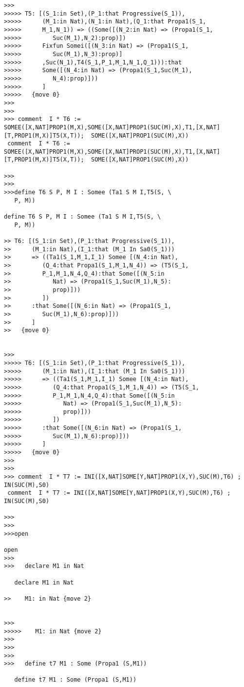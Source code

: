 \documentclass{article}
\begin{document}
\begin{verbatim}
>>>
>>>>> T5: [(S_1:in Set),(P_1:that Progressive(S_1)),
>>>>>      (M_1:in Nat),(N_1:in Nat),(Q_1:that Propa1(S_1,
>>>>>      M_1,N_1)) => ((Some([(N_2:in Nat) => (Propa1(S_1,
>>>>>         Suc(M_1),N_2):prop)])
>>>>>      Fixfun Somei([(N_3:in Nat) => (Propa1(S_1,
>>>>>         Suc(M_1),N_3):prop)]
>>>>>      ,Suc(N_1),T4(S_1,P_1,M_1,N_1,Q_1))):that
>>>>>      Some([(N_4:in Nat) => (Propa1(S_1,Suc(M_1),
>>>>>         N_4):prop)]))
>>>>>      ]
>>>>>   {move 0}
>>>
>>>
>>> comment  I * T6 := SOMEE([X,NAT]PROP1(M,X),SOME([X,NAT]PROP1(SUC(M),X),T1,[X,NAT][T,PROP1(M,X)]T5(X,T));  SOME([X,NAT]PROP1(SUC(M),X))
 comment  I * T6 := SOMEE([X,NAT]PROP1(M,X),SOME([X,NAT]PROP1(SUC(M),X),T1,[X,NAT][T,PROP1(M,X)]T5(X,T));  SOME([X,NAT]PROP1(SUC(M),X))

>>>
>>>
>>>define T6 S P, M I : Somee (Ta1 S M I,T5(S, \
   P, M))

define T6 S P, M I : Somee (Ta1 S M I,T5(S, \
   P, M))

>> T6: [(S_1:in Set),(P_1:that Progressive(S_1)),
>>      (M_1:in Nat),(I_1:that (M_1 In Sa0(S_1)))
>>      => ((Ta1(S_1,M_1,I_1) Somee [(N_4:in Nat),
>>         (Q_4:that Propa1(S_1,M_1,N_4)) => (T5(S_1,
>>         P_1,M_1,N_4,Q_4):that Some([(N_5:in
>>            Nat) => (Propa1(S_1,Suc(M_1),N_5):
>>            prop)]))
>>         ])
>>      :that Some([(N_6:in Nat) => (Propa1(S_1,
>>         Suc(M_1),N_6):prop)]))
>>      ]
>>   {move 0}


>>>
>>>>> T6: [(S_1:in Set),(P_1:that Progressive(S_1)),
>>>>>      (M_1:in Nat),(I_1:that (M_1 In Sa0(S_1)))
>>>>>      => ((Ta1(S_1,M_1,I_1) Somee [(N_4:in Nat),
>>>>>         (Q_4:that Propa1(S_1,M_1,N_4)) => (T5(S_1,
>>>>>         P_1,M_1,N_4,Q_4):that Some([(N_5:in
>>>>>            Nat) => (Propa1(S_1,Suc(M_1),N_5):
>>>>>            prop)]))
>>>>>         ])
>>>>>      :that Some([(N_6:in Nat) => (Propa1(S_1,
>>>>>         Suc(M_1),N_6):prop)]))
>>>>>      ]
>>>>>   {move 0}
>>>
>>>
>>> comment  I * T7 := INI([X,NAT]SOME[Y,NAT]PROP1(X,Y),SUC(M),T6) ; IN(SUC(M),S0)
 comment  I * T7 := INI([X,NAT]SOME[Y,NAT]PROP1(X,Y),SUC(M),T6) ; IN(SUC(M),S0)

>>>
>>>
>>>open

open
>>>
>>>   declare M1 in Nat

   declare M1 in Nat

>>    M1: in Nat {move 2}


>>>
>>>>>    M1: in Nat {move 2}
>>>
>>>
>>>
>>>   define t7 M1 : Some (Propa1 (S,M1))

   define t7 M1 : Some (Propa1 (S,M1))


\end{verbatim}
\end{document}
